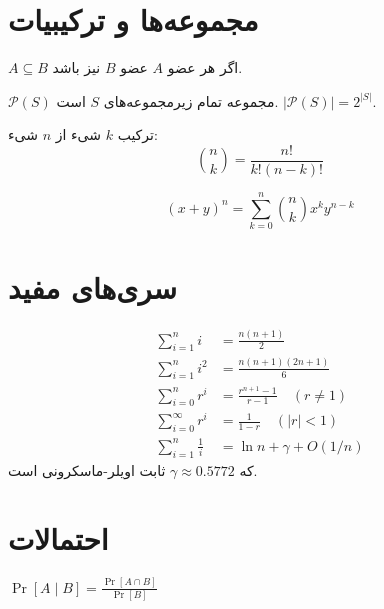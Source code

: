\documentclass{matinbook}
\begin{document}
    \section{مجموعه‌ها و ترکیبیات}
    
    \begin{definition}[زیرمجموعه]
        $A \subseteq B$ اگر هر عضو $A$
        عضو $B$ نیز باشد.
        \label{def:subset}
    \end{definition}
    
    \begin{definition}
        $\mathcal{P}(S)$ مجموعه تمام
        زیرمجموعه‌های $S$ است.
        $|\mathcal{P}(S)| = 2^{|S|}$.
        \label{def:power-set}
    \end{definition}
    
    ترکیب $k$ شیء از $n$ شیء:
    \[
    \binom{n}{k} = \frac{n!}{k!(n-k)!}
    \]
    
    \begin{theorem}
        \[
        (x + y)^{n} = \sum_{k=0}^{n}
        \binom{n}{k} x^{k} y^{n-k}
        \]
        \label{thm:binomial}
    \end{theorem}
    
    \section{سری‌های مفید}
    
    \begin{align}
        \sum_{i=1}^{n} i &= \frac{n(n+1)}{2} \\
        \sum_{i=1}^{n} i^{2} &= \frac{n(n+1)(2n+1)}{6} \\
        \sum_{i=0}^{n} r^{i} &= \frac{r^{n+1}-1}{r-1} \quad (r \neq 1) \\
        \sum_{i=0}^{\infty} r^{i} &= \frac{1}{1-r} \quad (|r| < 1) \\
        \sum_{i=1}^{n} \frac{1}{i} &= \ln n + \gamma + O(1/n)
    \end{align}
    که $\gamma \approx 0.5772$ ثابت اویلر-ماسکرونی است.
    
    \section{احتمالات}
    
    \begin{definition}
        $\Pr[A \mid B] = \frac{\Pr[A \cap B]}{\Pr[B]}$
        \label{def:conditional-probability}
    \end{definition}
    
\end{document}
